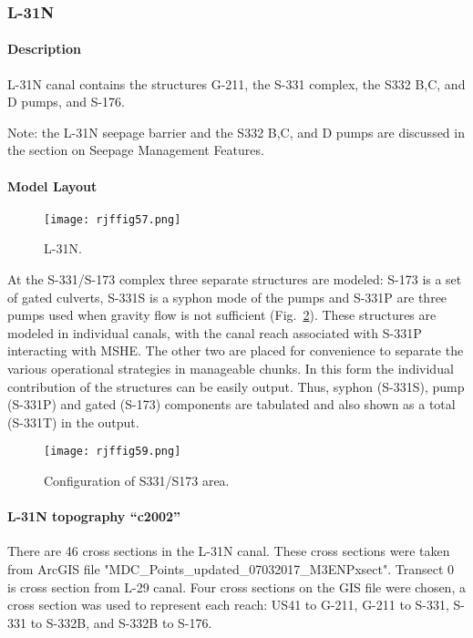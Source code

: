 \clearpage
\subsubsection{L-31N}
\paragraph{Description}
L-31N canal contains the structures G-211, the S-331 complex, the S332 B,C, and D pumps, and S-176.


Note: the L-31N seepage barrier and the S332 B,C, and D pumps are discussed in the section on Seepage Management Features.


\paragraph{Model Layout}

\begin{figure}[!h]
  \begin{center}
  \texttt{[image: rjffig57.png]}
  \caption{L-31N.}
  \label{fig:rjffig57}
  \end{center}
\end{figure}

At the S-331/S-173 complex three separate structures are modeled: S-173 is a set of gated culverts, S-331S is a syphon mode of the pumps and S-331P are three pumps used when gravity  flow is not sufficient (Fig.~\ref{fig:rjffig59}). These structures are modeled in individual canals, with the canal reach associated with S-331P interacting with MSHE. The other two are placed for convenience to separate the various operational strategies in manageable chunks. In this form the individual contribution of the structures can be easily output. Thus, syphon (S-331S), pump (S-331P) and gated (S-173) components are tabulated and also shown as a total (S-331T) in the output.

\begin{figure}[!h]
  \begin{center}
  \texttt{[image: rjffig59.png]}
  \caption{Configuration of S331/S173 area.}
  \label{fig:rjffig59}
  \end{center}
\end{figure}


\paragraph{L-31N topography ``c2002''}
There are 46 cross sections in the L-31N canal.  These cross sections were taken from ArcGIS file "MDC\_Points\_updated\_07032017\_M3ENPxsect".  Transect 0 is cross section from L-29 canal.  Four cross sections on the GIS file were chosen, a cross section was used to represent each reach: US41 to G-211, G-211 to S-331, S-331 to S-332B, and S-332B to S-176.

